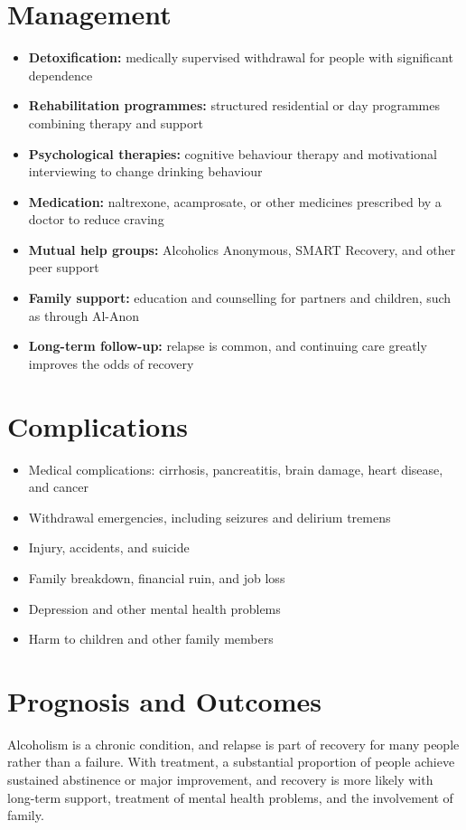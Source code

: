 \section*{Management}
\begin{itemize}
    \item \textbf{Detoxification:} medically supervised withdrawal for people with significant dependence
    \item \textbf{Rehabilitation programmes:} structured residential or day programmes combining therapy and support
    \item \textbf{Psychological therapies:} cognitive behaviour therapy and motivational interviewing to change drinking behaviour
    \item \textbf{Medication:} naltrexone, acamprosate, or other medicines prescribed by a doctor to reduce craving
    \item \textbf{Mutual help groups:} Alcoholics Anonymous, SMART Recovery, and other peer support
    \item \textbf{Family support:} education and counselling for partners and children, such as through Al-Anon
    \item \textbf{Long-term follow-up:} relapse is common, and continuing care greatly improves the odds of recovery
\end{itemize}

\section*{Complications}
\begin{itemize}
    \item Medical complications: cirrhosis, pancreatitis, brain damage, heart disease, and cancer
    \item Withdrawal emergencies, including seizures and delirium tremens
    \item Injury, accidents, and suicide
    \item Family breakdown, financial ruin, and job loss
    \item Depression and other mental health problems
    \item Harm to children and other family members
\end{itemize}

\section*{Prognosis and Outcomes}
Alcoholism is a chronic condition, and relapse is part of recovery for many people rather than a failure. With treatment, a substantial proportion of people achieve sustained abstinence or major improvement, and recovery is more likely with long-term support, treatment of mental health problems, and the involvement of family.

